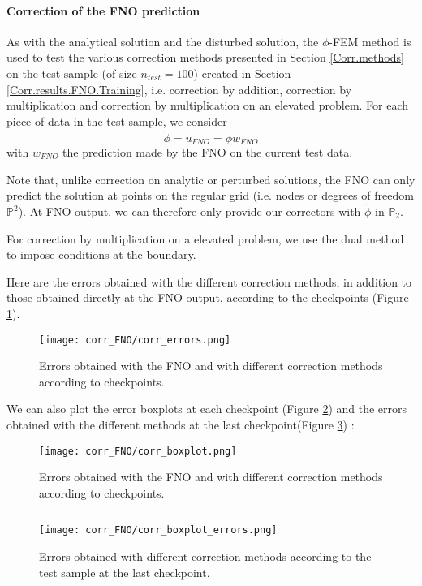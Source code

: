 \paragraph{Correction of the FNO prediction} \label{Corr.results.FNO.Corr}

As with the analytical solution and the disturbed solution, the $\phi$-FEM method is used to test the various correction methods presented in Section \ref{Corr.methods} on the test sample (of size $n_{test}=100$) created in Section \ref{Corr.results.FNO.Training}, i.e. correction by addition, correction by multiplication and correction by multiplication on an elevated problem. For each piece of data in the test sample, we consider  
\begin{equation*}
	\tilde{\phi}=u_{FNO}=\phi w_{FNO}
\end{equation*}
with $w_{FNO}$ the prediction made by the FNO on the current test data.

\begin{Rem}
	Note that, unlike correction on analytic or perturbed solutions, the FNO can only predict the solution at points on the regular grid (i.e. nodes or degrees of freedom $\mathbb{P}^2$). At FNO output, we can therefore only provide our correctors with $\tilde{\phi}$ in $\mathbb{P}_2$.
\end{Rem}

For correction by multiplication on a elevated problem, we use the dual method to impose conditions at the boundary.

Here are the errors obtained with the different correction methods, in addition to those obtained directly at the FNO output, according to the checkpoints (Figure \ref{corr_errors}).

\begin{figure}[H]
	\centering
	\texttt{[image: corr\_FNO/corr\_errors.png]}
	\caption{Errors obtained with the FNO and with different correction methods according to checkpoints.}
	\label{corr_errors}
\end{figure} 

We can also plot the error boxplots at each checkpoint (Figure \ref{corr_boxplot}) and the errors obtained with the different methods at the last checkpoint(Figure \ref{corr_boxplot_errors}) :

\begin{minipage}{0.58\linewidth}
	\begin{figure}[H]
		\centering
		\texttt{[image: corr\_FNO/corr\_boxplot.png]}
		\caption{Errors obtained with the FNO and with different correction methods according to checkpoints.}
		\label{corr_boxplot}
	\end{figure}
\end{minipage} $\quad$
\begin{minipage}{0.38\linewidth}
	\begin{figure}[H]
		\centering
		\texttt{[image: corr\_FNO/corr\_boxplot\_errors.png]}
		\caption{Errors obtained with different correction methods according to the test sample at the last checkpoint.}
		\label{corr_boxplot_errors}
	\end{figure}
\end{minipage}	


